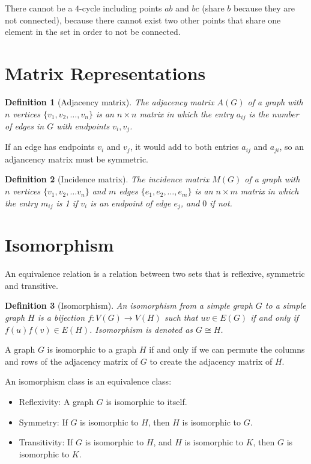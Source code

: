 \documentclass{article}
\newtheorem{defn}{Definition}[section]
\begin{document}
There cannot be a $4$-cycle including points $ab$ and $bc$ (share $b$ because they are not connected), because there cannot exist two other points that share one element in the set in order to not be connected.

\section{Matrix Representations}
\begin{defn}[Adjacency matrix]
	The adjacency matrix $A(G)$ of a graph with $n$ vertices $\{v_1,v_2,\ldots,v_n\}$ is an $n\times n$ matrix in which the entry $a_{ij}$ is the number of edges in $G$ with endpoints $v_i,v_j$.
\end{defn}
If an edge has endpoints $v_i$ and $v_j$, it would add to both entries $a_{ij}$ and $a_{ji}$, so an adjancency matrix must be symmetric.

\begin{defn}[Incidence matrix]
	The incidence matrix $M(G)$ of a graph with $n$ vertices $\{v_1,v_2,\ldots v_n\}$ and $m$ edges $\{e_1,e_2,\ldots,e_m\}$ is an $n\times m$ matrix in which the entry $m_{ij}$ is 1 if $v_i$ is an endpoint of edge $e_j$, and $0$ if not.
\end{defn}

\section{Isomorphism}
An equivalence relation is a relation between two sets that is reflexive, symmetric and transitive.

\begin{defn}[Isomorphism]
	An isomorphism from a simple graph $G$ to a simple graph $H$ is a bijection $f:V(G)\to V(H)$ such that $uv\in E(G)$ if and only if $f(u)f(v)\in E(H)$. Isomorphism is denoted as $G\cong H$.
\end{defn}

A graph $G$ is isomorphic to a graph $H$ if and only if we can permute the columns and rows of the adjacency matrix of $G$ to create the adjacency matrix of $H$.

An isomorphism class is an equivalence class:
\begin{itemize}
	\item Reflexivity: A graph $G$ is isomorphic to itself.
	\item Symmetry: If $G$ is isomorphic to $H$, then $H$ is isomorphic to $G$.
	\item Transitivity: If $G$ is isomorphic to $H$, and $H$ is isomorphic to $K$, then $G$ is isomorphic to $K$.
\end{itemize}
\end{document}
